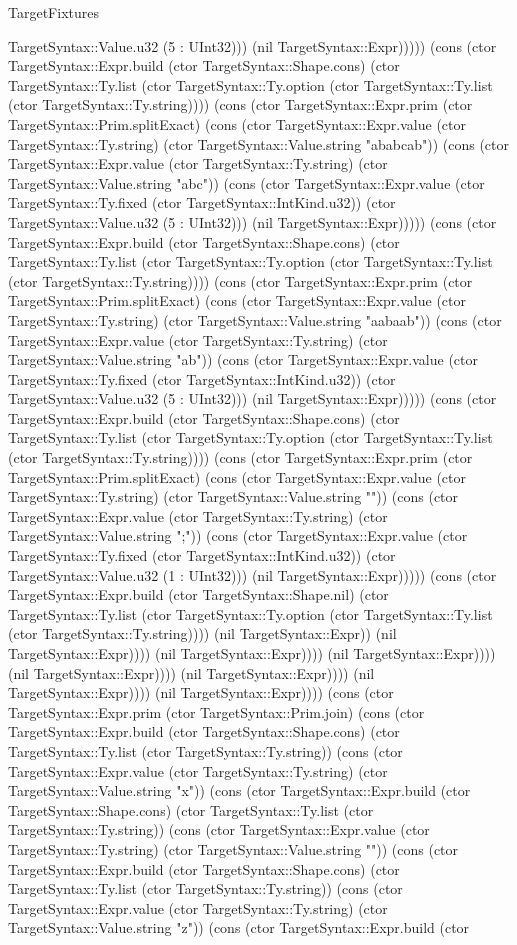 \begin{lexlean}{TargetFixtures}
\begin{semanticmodule}
{TargetSyntax::Value.u32 (5 : UInt32))) (nil TargetSyntax::Expr))))) (cons (ctor TargetSyntax::Expr.build (ctor TargetSyntax::Shape.cons) (ctor TargetSyntax::Ty.list (ctor TargetSyntax::Ty.option (ctor TargetSyntax::Ty.list (ctor TargetSyntax::Ty.string)))) (cons (ctor TargetSyntax::Expr.prim (ctor TargetSyntax::Prim.splitExact) (cons (ctor TargetSyntax::Expr.value (ctor TargetSyntax::Ty.string) (ctor TargetSyntax::Value.string "ababcab")) (cons (ctor TargetSyntax::Expr.value (ctor TargetSyntax::Ty.string) (ctor TargetSyntax::Value.string "abc")) (cons (ctor TargetSyntax::Expr.value (ctor TargetSyntax::Ty.fixed (ctor TargetSyntax::IntKind.u32)) (ctor TargetSyntax::Value.u32 (5 : UInt32))) (nil TargetSyntax::Expr))))) (cons (ctor TargetSyntax::Expr.build (ctor TargetSyntax::Shape.cons) (ctor TargetSyntax::Ty.list (ctor TargetSyntax::Ty.option (ctor TargetSyntax::Ty.list (ctor TargetSyntax::Ty.string)))) (cons (ctor TargetSyntax::Expr.prim (ctor TargetSyntax::Prim.splitExact) (cons (ctor TargetSyntax::Expr.value (ctor TargetSyntax::Ty.string) (ctor TargetSyntax::Value.string "aabaab")) (cons (ctor TargetSyntax::Expr.value (ctor TargetSyntax::Ty.string) (ctor TargetSyntax::Value.string "ab")) (cons (ctor TargetSyntax::Expr.value (ctor TargetSyntax::Ty.fixed (ctor TargetSyntax::IntKind.u32)) (ctor TargetSyntax::Value.u32 (5 : UInt32))) (nil TargetSyntax::Expr))))) (cons (ctor TargetSyntax::Expr.build (ctor TargetSyntax::Shape.cons) (ctor TargetSyntax::Ty.list (ctor TargetSyntax::Ty.option (ctor TargetSyntax::Ty.list (ctor TargetSyntax::Ty.string)))) (cons (ctor TargetSyntax::Expr.prim (ctor TargetSyntax::Prim.splitExact) (cons (ctor TargetSyntax::Expr.value (ctor TargetSyntax::Ty.string) (ctor TargetSyntax::Value.string "")) (cons (ctor TargetSyntax::Expr.value (ctor TargetSyntax::Ty.string) (ctor TargetSyntax::Value.string ";")) (cons (ctor TargetSyntax::Expr.value (ctor TargetSyntax::Ty.fixed (ctor TargetSyntax::IntKind.u32)) (ctor TargetSyntax::Value.u32 (1 : UInt32))) (nil TargetSyntax::Expr))))) (cons (ctor TargetSyntax::Expr.build (ctor TargetSyntax::Shape.nil) (ctor TargetSyntax::Ty.list (ctor TargetSyntax::Ty.option (ctor TargetSyntax::Ty.list (ctor TargetSyntax::Ty.string)))) (nil TargetSyntax::Expr)) (nil TargetSyntax::Expr)))) (nil TargetSyntax::Expr)))) (nil TargetSyntax::Expr)))) (nil TargetSyntax::Expr)))) (nil TargetSyntax::Expr)))) (nil TargetSyntax::Expr)))) (nil TargetSyntax::Expr)))) (cons (ctor TargetSyntax::Expr.prim (ctor TargetSyntax::Prim.join) (cons (ctor TargetSyntax::Expr.build (ctor TargetSyntax::Shape.cons) (ctor TargetSyntax::Ty.list (ctor TargetSyntax::Ty.string)) (cons (ctor TargetSyntax::Expr.value (ctor TargetSyntax::Ty.string) (ctor TargetSyntax::Value.string "x")) (cons (ctor TargetSyntax::Expr.build (ctor TargetSyntax::Shape.cons) (ctor TargetSyntax::Ty.list (ctor TargetSyntax::Ty.string)) (cons (ctor TargetSyntax::Expr.value (ctor TargetSyntax::Ty.string) (ctor TargetSyntax::Value.string "")) (cons (ctor TargetSyntax::Expr.build (ctor TargetSyntax::Shape.cons) (ctor TargetSyntax::Ty.list (ctor TargetSyntax::Ty.string)) (cons (ctor TargetSyntax::Expr.value (ctor TargetSyntax::Ty.string) (ctor TargetSyntax::Value.string "z")) (cons (ctor TargetSyntax::Expr.build (ctor }
\end{semanticmodule}
\end{lexlean}
